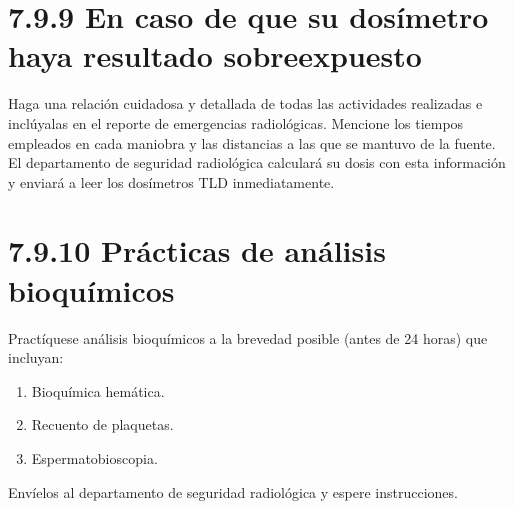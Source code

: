 
\section*{7.9.9 En caso de que su dosímetro haya resultado sobreexpuesto}
Haga una relación cuidadosa y detallada de todas las actividades realizadas e inclúyalas en el reporte de emergencias radiológicas. Mencione los tiempos empleados en cada maniobra y las distancias a las que se mantuvo de la fuente. El departamento de seguridad radiológica calculará su dosis con esta información y enviará a leer los dosímetros TLD inmediatamente.

\section*{7.9.10 Prácticas de análisis bioquímicos}
Practíquese análisis bioquímicos a la brevedad posible (antes de 24 horas) que incluyan:
\begin{enumerate}
    \item Bioquímica hemática.
    \item Recuento de plaquetas.
    \item Espermatobioscopia.
\end{enumerate}
Envíelos al departamento de seguridad radiológica y espere instrucciones.